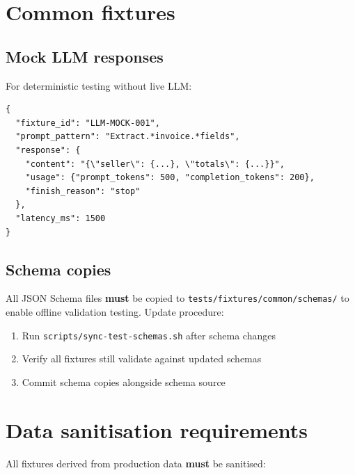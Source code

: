\section{Common fixtures}

\subsection{Mock LLM responses}

For deterministic testing without live LLM:

\begin{lstlisting}[basicstyle=\ttfamily\small,caption={Mock LLM response fixture.}]
{
  "fixture_id": "LLM-MOCK-001",
  "prompt_pattern": "Extract.*invoice.*fields",
  "response": {
    "content": "{\"seller\": {...}, \"totals\": {...}}",
    "usage": {"prompt_tokens": 500, "completion_tokens": 200},
    "finish_reason": "stop"
  },
  "latency_ms": 1500
}
\end{lstlisting}

\subsection{Schema copies}

All JSON Schema files \textbf{must} be copied to \texttt{tests/fixtures/common/schemas/}
to enable offline validation testing. Update procedure:

\begin{enumerate}
  \item Run \texttt{scripts/sync-test-schemas.sh} after schema changes
  \item Verify all fixtures still validate against updated schemas
  \item Commit schema copies alongside schema source
\end{enumerate}

\section{Data sanitisation requirements}

All fixtures derived from production data \textbf{must} be sanitised:

